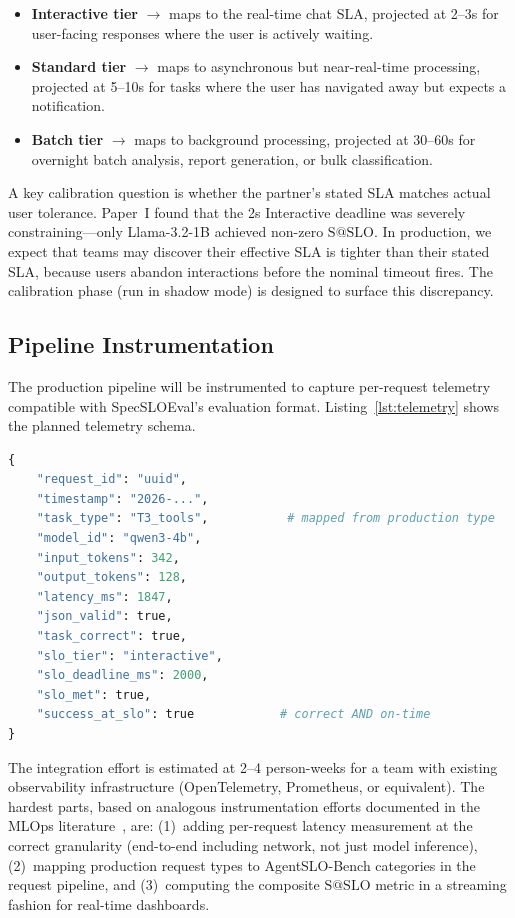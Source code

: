 \documentclass[11pt]{article}
\makeatletter
\newcommand{\sslo}{\ensuremath{\mathrm{S@SLO}}}
\makeatother
\begin{document}
\begin{itemize}[leftmargin=16pt]
    \item \textbf{Interactive tier} $\rightarrow$ maps to the real-time chat SLA, projected at 2--3s for user-facing responses where the user is actively waiting.
    \item \textbf{Standard tier} $\rightarrow$ maps to asynchronous but near-real-time processing, projected at 5--10s for tasks where the user has navigated away but expects a notification.
    \item \textbf{Batch tier} $\rightarrow$ maps to background processing, projected at 30--60s for overnight batch analysis, report generation, or bulk classification.
\end{itemize}

A key calibration question is whether the partner's stated SLA matches actual user tolerance. Paper~I found that the 2s Interactive deadline was severely constraining---only Llama-3.2-1B achieved non-zero $\sslo{}$. In production, we expect that teams may discover their effective SLA is tighter than their stated SLA, because users abandon interactions before the nominal timeout fires. The calibration phase (run in shadow mode) is designed to surface this discrepancy.

\subsection{Pipeline Instrumentation}

The production pipeline will be instrumented to capture per-request telemetry compatible with SpecSLOEval's evaluation format. Listing~\ref{lst:telemetry} shows the planned telemetry schema.

\begin{lstlisting}[caption={Per-request telemetry schema for SpecSLOEval integration.},label={lst:telemetry},language=Python]
{
    "request_id": "uuid",
    "timestamp": "2026-...",
    "task_type": "T3_tools",           # mapped from production type
    "model_id": "qwen3-4b",
    "input_tokens": 342,
    "output_tokens": 128,
    "latency_ms": 1847,
    "json_valid": true,
    "task_correct": true,
    "slo_tier": "interactive",
    "slo_deadline_ms": 2000,
    "slo_met": true,
    "success_at_slo": true            # correct AND on-time
}
\end{lstlisting}

The integration effort is estimated at 2--4 person-weeks for a team with existing observability infrastructure (OpenTelemetry, Prometheus, or equivalent). The hardest parts, based on analogous instrumentation efforts documented in the MLOps literature~\cite{kreuzberger2023mlops}, are: (1)~adding per-request latency measurement at the correct granularity (end-to-end including network, not just model inference), (2)~mapping production request types to AgentSLO-Bench categories in the request pipeline, and (3)~computing the composite $\sslo{}$ metric in a streaming fashion for real-time dashboards.
\end{document}
